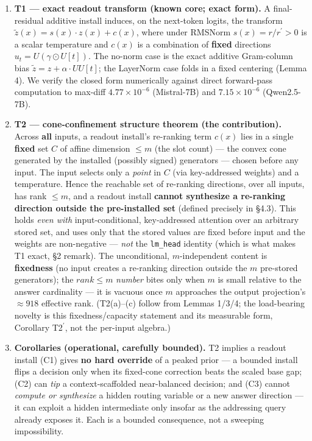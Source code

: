 \documentclass[11pt]{article}
\theoremstyle{plain}
\theoremstyle{definition}
\begin{document}
\begin{enumerate}
\item \textbf{T1 --- exact readout transform (known core; exact form).} A final-residual additive install induces, on the next-token logits, the transform $\tilde z(x) = s(x)\cdot z(x) + c(x)$, where under RMSNorm $s(x) = r/r^{\prime} > 0$ is a scalar temperature and $c(x)$ is a combination of \textbf{fixed} directions $u_t = U(\gamma \odot U[t])$. The no-norm case is the exact additive Gram-column bias $\tilde z = z + \alpha\cdot U U[t]$; the LayerNorm case folds in a fixed centering (Lemma 4). We verify the closed form numerically against direct forward-pass computation to max-diff $4.77\times10^{-6}$ (Mistral-7B) and $7.15\times10^{-6}$ (Qwen2.5-7B).

\item \textbf{T2 --- cone-confinement structure theorem (the contribution).} Across \textbf{all} inputs, a readout install's re-ranking term $c(x)$ lies in a single \textbf{fixed} set $C$ of affine dimension $\le m$ (the slot count) --- the convex cone generated by the installed (possibly signed) generators --- chosen before any input. The input selects only a \emph{point} in $C$ (via key-addressed weights) and a temperature. Hence the reachable set of re-ranking directions, over all inputs, has rank $\le m$, and a readout install \textbf{cannot synthesize a re-ranking direction outside the pre-installed set} (defined precisely in \S4.3). This holds \emph{even with} input-conditional, key-addressed attention over an arbitrary stored set, and uses only that the stored values are fixed before input and the weights are non-negative --- \emph{not} the \texttt{lm\_head} identity (which is what makes T1 exact, \S2 remark). The unconditional, $m$-independent content is \textbf{fixedness} (no input creates a re-ranking direction outside the $m$ pre-stored generators); the $\textit{rank} \le m$ \emph{number} bites only when $m$ is small relative to the answer cardinality --- it is vacuous once $m$ approaches the output projection's $\approx918$ effective rank. (T2(a)--(c) follow from Lemmas 1/3/4; the load-bearing novelty is this fixedness/capacity statement and its measurable form, Corollary T2$^{\prime}$, not the per-input algebra.)

\item \textbf{Corollaries (operational, carefully bounded).} T2 implies a readout install (C1) gives \textbf{no hard override} of a peaked prior --- a bounded install flips a decision only when its fixed-cone correction beats the scaled base gap; (C2) can \emph{tip} a context-scaffolded near-balanced decision; and (C3) cannot \emph{compute or synthesize} a hidden routing variable or a new answer direction --- it can exploit a hidden intermediate only insofar as the addressing query already exposes it. Each is a bounded consequence, not a sweeping impossibility.


\end{enumerate}
\end{document}
